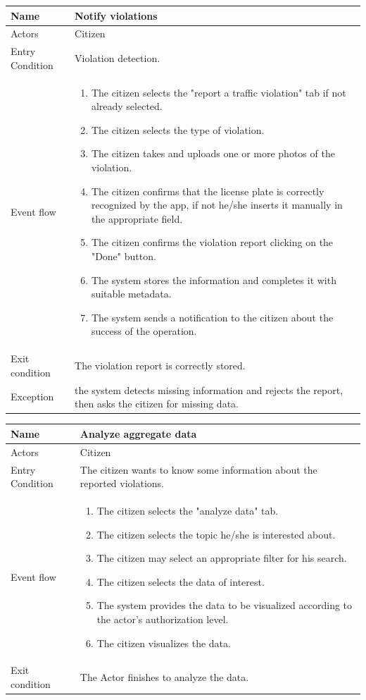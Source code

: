\vskip 0.2in
\begin{tabular}{|p{3.1cm}|p{11.6cm}|}
\hline
Name & Notify violations\\
\hline
Actors & Citizen\\
\hline
Entry Condition & Violation detection.\\
\hline
Event flow & \begin{enumerate}
                \item The citizen selects the "report a traffic violation" tab if not already selected.
                \item The citizen selects the type of violation.
                \item The citizen takes and uploads one or more photos of the violation.
                \item The citizen confirms that the license plate is correctly recognized by the app, if not he/she inserts it manually in the appropriate field.
                \item The citizen confirms the violation report clicking on the "Done" button.
                \item The system stores the information and completes it with suitable metadata.
                \item The system sends a notification to the citizen about the success of the operation.
            \end{enumerate}\\
\hline
Exit condition & The violation report is correctly stored.\\
\hline
Exception & the system detects missing information and rejects the report, then asks the citizen for missing data.\\
\hline
\end{tabular}

\vskip 0.2in
\begin{tabular}{|p{3.1cm}|p{11.6cm}|}
\hline
Name & Analyze aggregate data\\
\hline
Actors & Citizen\\
\hline
Entry Condition & The citizen wants to know some information about the reported violations.\\
\hline
Event flow & \begin{enumerate}
                \item The citizen selects the "analyze data" tab.
                \item The citizen selects the topic he/she is interested about.
                \item The citizen may select an appropriate filter for his search.
                \item The citizen selects the data of interest.
                \item The system provides the data to be visualized according to the actor's authorization level.
                \item The citizen visualizes the data.
            \end{enumerate}\\
\hline
Exit condition & The Actor finishes to analyze the data.\\
\hline
\end{tabular}


